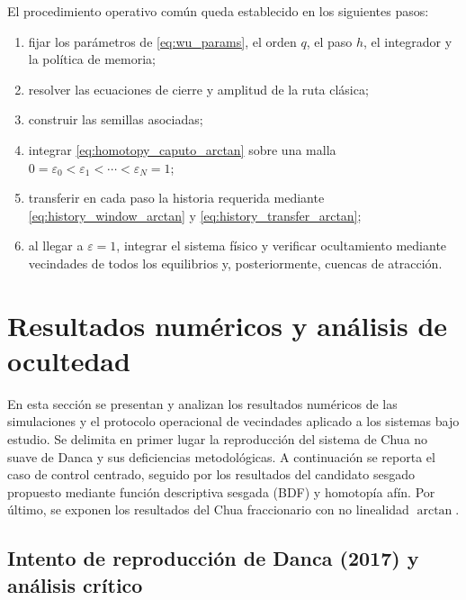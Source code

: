\documentclass[journal]{IEEEtran}
\begin{document}
El procedimiento operativo común queda establecido en los siguientes pasos:
\begin{enumerate}[leftmargin=1.8em,label=\arabic*)]
\item fijar los parámetros de \eqref{eq:wu_params}, el orden $q$, el paso $h$, el integrador y la política de memoria;
\item resolver las ecuaciones de cierre y amplitud de la ruta clásica;
\item construir las semillas asociadas;
\item integrar \eqref{eq:homotopy_caputo_arctan} sobre una malla $0=\varepsilon_0<\varepsilon_1<\cdots<\varepsilon_N=1$;
\item transferir en cada paso la historia requerida mediante \eqref{eq:history_window_arctan} y \eqref{eq:history_transfer_arctan};
\item al llegar a $\varepsilon=1$, integrar el sistema físico y verificar ocultamiento mediante vecindades de todos los equilibrios y, posteriormente, cuencas de atracción.
\end{enumerate}

\section{Resultados numéricos y análisis de ocultedad}
\label{sec:resultados_numericos}

En esta sección se presentan y analizan los resultados numéricos de las simulaciones y el protocolo operacional de vecindades aplicado a los sistemas bajo estudio. Se delimita en primer lugar la reproducción del sistema de Chua no suave de Danca \cite{Danca2017} y sus deficiencias metodológicas. A continuación se reporta el caso de control centrado, seguido por los resultados del candidato sesgado propuesto mediante función descriptiva sesgada (BDF) y homotopía afín. Por último, se exponen los resultados del Chua fraccionario con no linealidad $\arctan$.

\subsection{Intento de reproducción de Danca (2017) y análisis crítico}
\label{subsec:resultados_danca_exactos}
\end{document}
